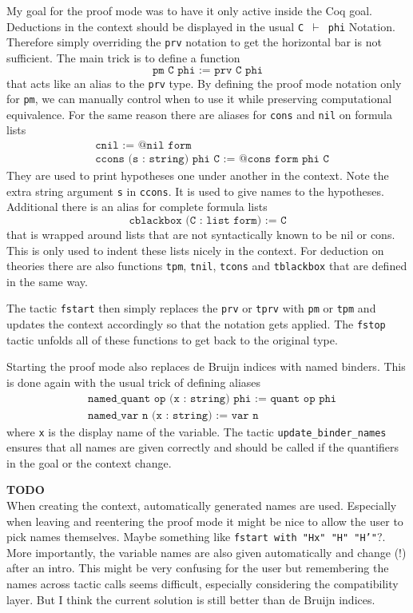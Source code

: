 \documentclass[12pt, a4paper]{article}
\newcommand{\coq}[1]{\texttt{#1}}
\newcommand{\improve}[1]{
	\vspace{3pt}
	\begin{boximprove}
		\textcolor{colorimprove}{\textbf{TODO}\\#1}
	\end{boximprove}}
\begin{document}
My goal for the proof mode was to have it only active inside the Coq goal.
Deductions in the context should be displayed in the usual \texttt{C $\vdash$ phi} Notation.
Therefore simply overriding the \texttt{prv} notation to get the horizontal bar is not sufficient.
The main trick is to define a function
$$\coq{pm C phi := prv C phi}$$
that acts like an alias to the \texttt{prv} type.
By defining the proof mode notation only for \texttt{pm}, we can manually control when to use it while preserving computational equivalence.
For the same reason there are aliases for \texttt{cons} and \texttt{nil} on formula lists
\begin{align*}
	&\coq{cnil := @nil form} \\
	&\coq{ccons (s : string) phi C  := @cons form phi C}
\end{align*}
They are used to print hypotheses one under another in the context.
Note the extra string argument \texttt{s} in \texttt{ccons}.
It is used to give names to the hypotheses.
Additional there is an alias for complete formula lists
$$\coq{cblackbox (C : list form) := C}$$
that is wrapped around lists that are not syntactically known to be nil or cons.
This is only used to indent these lists nicely in the context.
For deduction on theories there are also functions \texttt{tpm}, \texttt{tnil}, \texttt{tcons} and \texttt{tblackbox} that are defined in the same way.

\medskip\noindent
The tactic \texttt{fstart} then simply replaces the \texttt{prv} or \texttt{tprv} with \texttt{pm} or \texttt{tpm} and updates the context accordingly so that the notation gets applied. The \texttt{fstop} tactic unfolds all of these functions to get back to the original type.

Starting the proof mode also replaces de Bruijn indices with named binders. This is done again with the usual trick of defining aliases
\begin{align*}
	&\coq{named_quant op (x : string) phi := quant op phi} \\
	&\coq{named_var n (x : string) := var n}
\end{align*}
where \texttt{x} is the display name of the variable.
The tactic \texttt{update\_binder\_names} ensures that all names are given correctly and should be called if the quantifiers in the goal or the context change.

\improve{When creating the context, automatically generated names are used. Especially when leaving and reentering the proof mode it might be nice to allow the user to pick names themselves. Maybe something like \texttt{fstart with "Hx" "H" "H'"}?.
\medskip\\
More importantly, the variable names are also given automatically and change (!) after an intro. This might be very confusing for the user but remembering the names across tactic calls seems difficult, especially considering the compatibility layer. But I think the current solution is still better than de Bruijn indices.}
\end{document}
